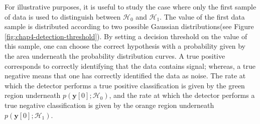 For illustrative purposes, it is useful to study the case where only the first sample of data is used to distinguish between $\mathcal{H}_0$ and $\mathcal{H}_1$. The value of the first data sample is distributed according to two possible Gaussian distributions(see Figure \ref{fig:chap4-detection-threshold}). By setting a decision threshold on the value of this sample, one can choose the correct hypothesis with a probability given by the area underneath the probability distribution curves. A true positive corresponds to correctly identifying that the data contains signal; whereas, a true negative means that one has correctly identified the data as noise. The rate at which the detector performs a true positive classification is given by the green region underneath $p(\bm{y}[0];\mathcal{H}_0)$, and the rate at which the detector performs a true negative classification is given by the orange region underneath $p(\bm{y}[0];\mathcal{H}_1)$.
